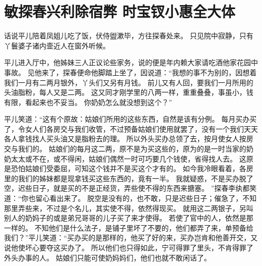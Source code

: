 \chapter{敏探春兴利除宿弊 \quad 时宝钗小惠全大体}
\par
话说平儿陪着凤姐儿吃了饭，伏侍盥漱毕，方往探春处来。
只见院中寂静，只有丫鬟婆子诸内壸近人在窗外听候。
\par
平儿进入厅中，他姊妹三人正议论些家务，说的便是年内赖大家请吃酒他家花园中事故。
见他来了，探春便命他脚踏上坐了，因说道：“我想的事不为别的，因想着我们一月有二两月银外，丫头们又另有月钱。
前儿又有人回，要我们一月所用的头油脂粉，每人又是二两。
这又同才刚学里的八两一样，重重叠叠，事虽小，钱有限，看起来也不妥当。
你奶奶怎么就没想到这个？”\par
平儿笑道：“这有个原故：姑娘们所用的这些东西，自然是该有分例。
每月买办买了，令女人们各房交与我们收管，不过预备姑娘们使用就罢了，没有一个我们天天各人拿钱找人买头油又是脂粉去的理。
所以外头买办总领了去，按月使女人按房交与我们的。
姑娘们的每月这二两，原不是为买这些的，原为的是一时当家的奶奶太太或不在，或不得闲，姑娘们偶然一时可巧要几个钱使，省得找人去。
这原是恐怕姑娘们受委屈，可知这个钱并不是买这个才有的。
如今我冷眼看着，各房里的我们的姊妹都是现拿钱买这些东西的，竟有一半。
我就疑惑，不是买办脱了空，迟些日子，就是买的不是正经货，弄些使不得的东西来搪塞。
”探春李纨都笑道：“你也留心看出来了。
脱空是没有的，也不敢，只是迟些日子；催急了，不知那里弄些来，不过是个名儿，其实使不得，依然得现买。
就用这二两银子，另叫别人的奶妈子的或是弟兄哥哥的儿子买了来才使得。
若使了官中的人，依然是那一样的。
不知他们是什么法子，是铺子里坏了不要的，他们都弄了来，单预备给我们？”平儿笑道：“买办买的是那样的，他买了好的来，买办岂肯和他善开交，又说他使坏心要夺这买办了。
所以他们也只得如此，宁可得罪了里头，不肯得罪了外头办事的人。
姑娘们只能可使奶妈妈们，他们也就不敢闲话了。
